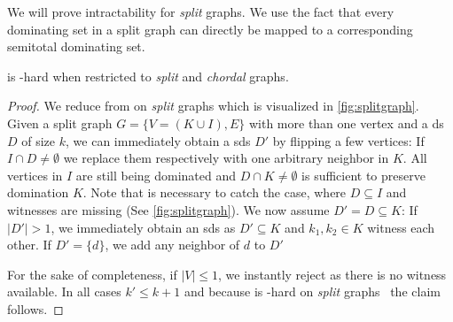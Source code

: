 We will prove intractability for \textit{split} graphs. 
We use the fact that every dominating set in a split graph can directly be mapped to a corresponding semitotal dominating set.

\begin{theorem}\label{lemma:splitgraph}
    \sdom is \WONEhs-hard when restricted to \textit{split} and \textit{chordal} graphs.
\end{theorem}

\begin{proof}

    We reduce from \dom on \textit{split} graphs which is visualized in \cref{fig:splitgraph}.
    Given a split graph $G = \{V = (K \cup I), E\}$ with more than one vertex and a ds $D$ of size $k$, we can immediately obtain a sds $D'$ by flipping a few vertices:
    If $I \cap D \neq \emptyset$ we replace them respectively with one arbitrary neighbor in $K$.
    All vertices in $I$ are still being dominated and $D \cap K \neq \emptyset$ is sufficient to preserve domination $K$. 
    Note that is necessary to catch the case, where $D \subseteq I$ and witnesses are missing (See \cref{fig:splitgraph}).
    We now assume $D' = D \subseteq K$:
    If $|D'| > 1$, we immediately obtain an sds as $D' \subseteq K$ and $k_1,k_2\in K$ witness each other.
    If $D' = \{d\}$, we add any neighbor of $d$ to $D'$
    
    For the sake of completeness, if $|V| \leq 1$, we instantly reject as there is no witness available.
    In all cases $k' \leq k + 1$ and because \dom is \WTWOhs-hard on \textit{split} graphs~\cite{Raman2008} the claim follows.

%    


\end{proof}

